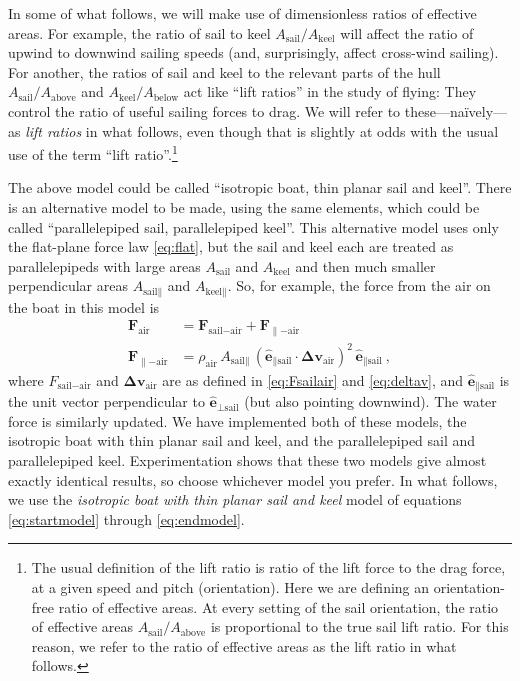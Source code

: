 \documentclass[letterpaper]{article}
\renewcommand{\vec}[1]{\boldsymbol{#1}}
\newcommand{\uvec}{\vec{\hat{e}}}
\newcommand{\air}{\text{air}}
\newcommand{\sail}{\text{sail}}
\newcommand{\keel}{\text{keel}}
\renewcommand{\above}{\text{above}}
\newcommand{\below}{\text{below}}
\begin{document}
In some of what follows, we will make use of dimensionless ratios of effective areas.
For example, the ratio of sail to keel $A_\sail/A_\keel$ will affect the ratio of upwind to downwind sailing speeds (and, surprisingly, affect cross-wind sailing).
For another, the ratios of sail and keel to the relevant parts of the hull $A_\sail/A_\above$ and $A_\keel/A_\below$ act like ``lift ratios'' in the study of flying:
They control the ratio of useful sailing forces to drag.
We will refer to these---na\"ively---as \emph{lift ratios} in what follows, even though that is slightly at odds with the usual use of the term ``lift ratio''.\footnote{The usual definition of the lift ratio is ratio of the lift force to the drag force, at a given speed and pitch (orientation). Here we are defining an orientation-free ratio of effective areas. At every setting of the sail orientation, the ratio of effective areas $A_\sail/A_\above$ is proportional to the true sail lift ratio. For this reason, we refer to the ratio of effective areas as the lift ratio in what follows.}

The above model could be called ``isotropic boat, thin planar sail and keel''.
There is an alternative model to be made, using the same elements, which could be called ``parallelepiped sail, parallelepiped keel''.
This alternative model uses only the flat-plane force law \eqref{eq:flat}, but the sail and keel each are treated as parallelepipeds with large areas $A_\sail$ and $A_\keel$ and then much smaller perpendicular areas $A_{\sail\parallel}$ and $A_{\keel\parallel}$.
So, for example, the force from the air on the boat in this model is
\begin{align}
  \vec{F}_\air &= \vec{F}_{\sail-\air} + \vec{F}_{\parallel-\air}
  \\
  \vec{F}_{\parallel-\air} & = \rho_\air\,A_{\sail\parallel}\,(\uvec_{\parallel\sail}\cdot\vec{\Delta v}_\air)^2\,\uvec_{\parallel\sail}
   ~,
\end{align}
where $F_{\sail-\air}$ and $\vec{\Delta v}_\air$ are as defined in \eqref{eq:Fsailair} and \eqref{eq:deltav}, and $\uvec_{\parallel\sail}$ is the unit vector perpendicular to $\uvec_{\perp\sail}$ (but also pointing downwind).
The water force is similarly updated.
We have implemented both of these models, the isotropic boat with thin planar sail and keel, and the parallelepiped sail and parallelepiped keel.
Experimentation shows that these two models give almost exactly identical results, so choose whichever model you prefer.
In what follows, we use the \emph{isotropic boat with thin planar sail and keel} model of equations \eqref{eq:startmodel} through \eqref{eq:endmodel}.
\end{document}
